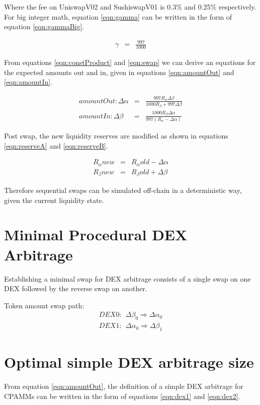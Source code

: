 \documentclass[runningheads]{llncs}
\begin{document}
Where the fee on UniswapV02 and SushiswapV01 is 0.3\% and 0.25\% respectively. For big integer math, equation \ref{eqn:gamma} can be written in the form of equation \ref{eqn:gammaBig}.

\begin{eqnarray}
	\gamma  &=& \frac{997}{1000} \label{eqn:gammaBig}
\end{eqnarray}

From equations \ref{eqn:constProduct} and \ref{eqn:swap} we can derive an equations for the expected amounts out and in, given in equations \ref{eqn:amountOut} and \ref{eqn:amountIn}.

\begin{eqnarray}
	amountOut: \Delta\alpha  &=& \frac{997 R_{\alpha} \Delta\beta }{1000 R_{\beta} + 997 \Delta\beta} \label{eqn:amountOut}\\
	amountIn: \Delta\beta  &=& \frac{1000 R_{\beta} \Delta\alpha }{997 (R_{\alpha} - \Delta\alpha)} \label{eqn:amountIn}
\end{eqnarray}

Post swap, the new liquidity reserves are modified as shown in equations \ref{eqn:reserveA} and \ref{eqn:reserveB}.

\begin{eqnarray}
	R_{\alpha}{new}  &=& R_{\alpha}{old} - \Delta\alpha  \label{eqn:reserveA}\\
	R_{\beta}{new}  &=& R_{\beta}{old} + \Delta\beta  \label{eqn:reserveB}
\end{eqnarray}

Therefore sequential swaps can be simulated off-chain in a deterministic way, given the current liquidity state.

\section{Minimal Procedural DEX Arbitrage}
Establishing a minimal swap for DEX arbitrage consists of a single swap on one DEX followed by the reverse swap on another.

Token amount swap path:
\begin{eqnarray}
	DEX0: \: \: \Delta\beta_{0} \Rightarrow \Delta\alpha_{0}\\
	DEX1: \: \: \Delta\alpha_{0} \Rightarrow \Delta\beta_{1}
\end{eqnarray}

\section{Optimal simple DEX arbitrage size}
From equation \ref{eqn:amountOut}, the definition of a simple DEX arbitrage for CPAMMs can be written in the form of equations \ref{eqn:dex1} and \ref{eqn:dex2}.
\end{document}
